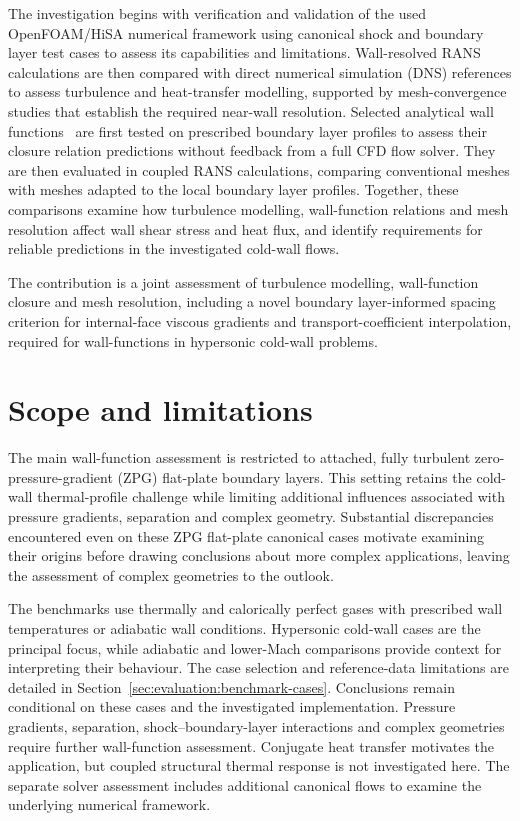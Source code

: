 The investigation begins with verification and validation of the used OpenFOAM/HiSA numerical framework using canonical shock and boundary layer test cases to assess its capabilities and limitations. Wall-resolved RANS calculations are then compared with direct numerical simulation (DNS) references to assess turbulence and heat-transfer modelling, supported by mesh-convergence studies that establish the required near-wall resolution. Selected analytical wall functions~\cite{li2025WF,griffin2023WF} are first tested on prescribed boundary layer profiles to assess their closure relation predictions without feedback from a full CFD flow solver. They are then evaluated in coupled RANS calculations, comparing conventional meshes with meshes adapted to the local boundary layer profiles. Together, these comparisons examine how turbulence modelling, wall-function relations and mesh resolution affect wall shear stress and heat flux, and identify requirements for reliable predictions in the investigated cold-wall flows.
\par\medskip

The contribution is a joint assessment of turbulence modelling, wall-function closure and mesh resolution, including a novel boundary layer-informed spacing criterion for internal-face viscous gradients and transport-coefficient interpolation, required for wall-functions in hypersonic cold-wall problems.

\section{Scope and limitations}
\label{sec:introduction:scope-assumptions-limitations}

The main wall-function assessment is restricted to attached, fully turbulent zero-pressure-gradient (ZPG) flat-plate boundary layers. This setting retains the cold-wall thermal-profile challenge while limiting additional influences associated with pressure gradients, separation and complex geometry. Substantial discrepancies encountered even on these ZPG flat-plate canonical cases motivate examining their origins before drawing conclusions about more complex applications, leaving the assessment of complex geometries to the outlook.
\par\medskip

The benchmarks use thermally and calorically perfect gases with prescribed wall temperatures or adiabatic wall conditions. Hypersonic cold-wall cases are the principal focus, while adiabatic and lower-Mach comparisons provide context for interpreting their behaviour. The case selection and reference-data limitations are detailed in Section~\ref{sec:evaluation:benchmark-cases}. Conclusions remain conditional on these cases and the investigated implementation. Pressure gradients, separation, shock--boundary-layer interactions and complex geometries require further wall-function assessment. Conjugate heat transfer motivates the application, but coupled structural thermal response is not investigated here. The separate solver assessment includes additional canonical flows to examine the underlying numerical framework.
\par\medskip

